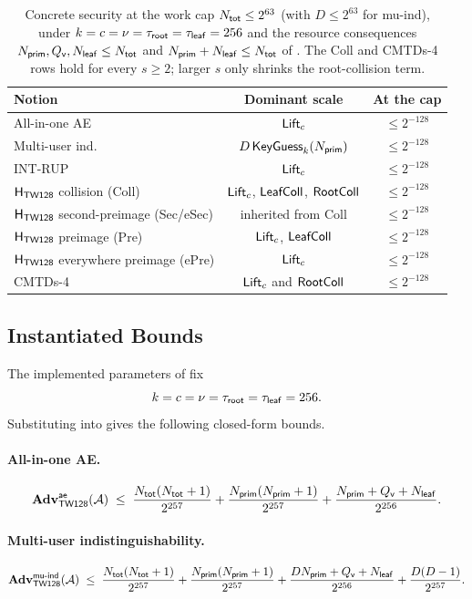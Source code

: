 \begin{table}[t]
\centering
\caption{Concrete \TW{} security at the work cap $N_{\mathsf{tot}} \leq 2^{63}$
(with $D \leq 2^{63}$ for mu-ind), under
$k = c = \nu = \tau_{\mathsf{root}} = \tau_{\mathsf{leaf}} = 256$ and the resource consequences
$N_{\mathsf{prim}}, Q_{\mathsf{v}}, N_{\mathsf{leaf}} \leq N_{\mathsf{tot}}$ and $N_{\mathsf{prim}} + N_{\mathsf{leaf}} \leq N_{\mathsf{tot}}$ of
. The Coll and
CMTDs-4 rows hold for every $s \geq 2$; larger $s$ only shrinks the
root-collision term.}
\label{tab:concrete-security}
\begin{tabular}{@{}lcc@{}}
\toprule
Notion & Dominant scale & At the cap \\
\midrule
All-in-one AE & $\mathsf{Lift}_c$ & $\leq 2^{-128}$ \\
Multi-user ind. & $D\,\mathsf{KeyGuess}_k(N_{\mathsf{prim}})$ & $\leq 2^{-128}$ \\
\textsf{INT-RUP} & $\mathsf{Lift}_c$ & $\leq 2^{-128}$ \\
$\mathsf{H}_{\mathsf{TW128}}$ collision (Coll) & $\mathsf{Lift}_c$, $\mathsf{LeafColl}$, $\mathsf{RootColl}$ & $\leq 2^{-128}$ \\
$\mathsf{H}_{\mathsf{TW128}}$ second-preimage (Sec/eSec) & inherited from Coll & $\leq 2^{-128}$ \\
$\mathsf{H}_{\mathsf{TW128}}$ preimage (Pre) & $\mathsf{Lift}_c$, $\mathsf{LeafColl}$ & $\leq 2^{-128}$ \\
$\mathsf{H}_{\mathsf{TW128}}$ everywhere preimage (ePre) & $\mathsf{Lift}_c$ & $\leq 2^{-128}$ \\
CMTDs-4 \cite{BH22} & $\mathsf{Lift}_c$ and $\mathsf{RootColl}$ & $\leq 2^{-128}$ \\
\bottomrule
\end{tabular}
\end{table}

\subsection{Instantiated Bounds}
\label{sec:concrete}

The implemented parameters of  fix
\[
  k = c = \nu = \tau_{\mathsf{root}} = \tau_{\mathsf{leaf}} = 256.
\]
Substituting into
gives the following closed-form bounds.

\paragraph{All-in-one AE.}
\[
  \mathbf{Adv}^{\mathsf{ae}}_{\textsf{TW128}}(\mathcal{A})
  \;\leq\;
  \frac{N_{\mathsf{tot}}(N_{\mathsf{tot}} + 1)}{2^{257}}
  + \frac{N_{\mathsf{prim}}(N_{\mathsf{prim}} + 1)}{2^{257}}
  + \frac{N_{\mathsf{prim}} + Q_{\mathsf{v}} + N_{\mathsf{leaf}}}{2^{256}}.
\]

\paragraph{Multi-user indistinguishability.}
\[
  \mathbf{Adv}^{\mathsf{mu\text{-}ind}}_{\textsf{TW128}}(\mathcal{A})
  \;\leq\;
  \frac{N_{\mathsf{tot}}(N_{\mathsf{tot}} + 1)}{2^{257}}
  + \frac{N_{\mathsf{prim}}(N_{\mathsf{prim}} + 1)}{2^{257}}
  + \frac{D N_{\mathsf{prim}} + Q_{\mathsf{v}} + N_{\mathsf{leaf}}}{2^{256}}
  + \frac{D(D - 1)}{2^{257}}.
\]

